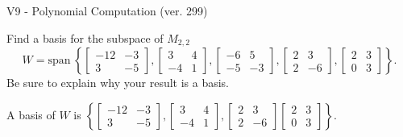 \begin{exercise}
  \begin{exerciseTitle}V9 - Polynomial Computation (ver. 299)\end{exerciseTitle}
  \begin{exerciseStatement}
    Find a basis for the subspace of \(M_{2,2}\) 
\[W=\mathrm{span}\ \left\{\left[\begin{array}{cc}
-12 & -3 \\
3 & -5
\end{array}\right] , \left[\begin{array}{cc}
3 & 4 \\
-4 & 1
\end{array}\right] , \left[\begin{array}{cc}
-6 & 5 \\
-5 & -3
\end{array}\right] , \left[\begin{array}{cc}
2 & 3 \\
2 & -6
\end{array}\right] , \left[\begin{array}{cc}
2 & 3 \\
0 & 3
\end{array}\right]\right\}.\]
 Be sure to explain why your result is a basis.


  \end{exerciseStatement}
  \begin{exerciseAnswer}
   A basis of \(W\) is  \(\left\{\left[\begin{array}{cc}
-12 & -3 \\
3 & -5
\end{array}\right] , \left[\begin{array}{cc}
3 & 4 \\
-4 & 1
\end{array}\right] , \left[\begin{array}{cc}
2 & 3 \\
2 & -6
\end{array}\right] \left[\begin{array}{cc}
2 & 3 \\
0 & 3
\end{array}\right]\right\}\).
  


  \end{exerciseAnswer}
\end{exercise}